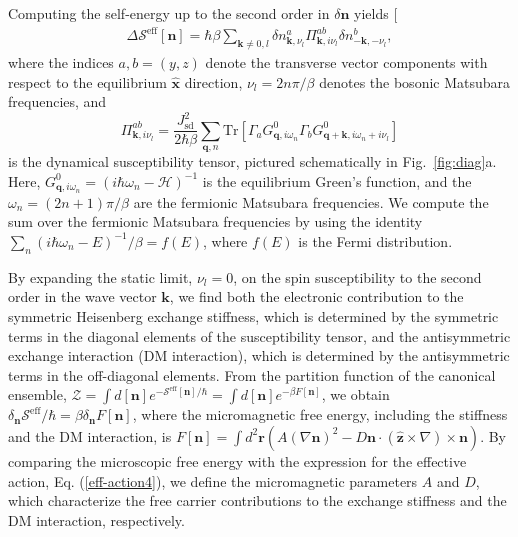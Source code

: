 \documentclass[aps,prl,twocolumn,amsmath,amssymb,superscriptaddress]{revtex4}%
\renewcommand{\cite}[1]{{[}\onlinecite{#1}{]}}
\newcommand{\be}{\begin{equation}}
\newcommand{\e}{\end{equation}}
\newcommand{\bb}{\boldsymbol}
\begin{document}
Computing the self-energy up to the second order in $\delta\bm{n}$ yields \cite{kzero}
\begin{align}
\label{eff-action4}
\Delta \mathcal{S}^{\mathrm{eff}}[\bm{n}]=\hbar\beta\sum_{\bm{k}\neq 0,l}\delta n^a_{\bm{k},\nu_l} \Pi^{ab}_{\bm{k},i\nu_l} \delta n^b_{-\bm{k},-\nu_l},
\end{align}
where the indices $a, b=(y,z)$ denote the transverse vector components with respect to the equilibrium $\hat{\bb{x}}$ direction, $\nu_l=2 n\pi/ \beta$ denotes the bosonic Matsubara frequencies, and
\be
\label{polarizibility-pi}
\Pi^{ab}_{\bm{k},i\nu_l}=\frac{J^2_{\mathrm{sd}}}{2\hbar\beta}\sum_{\bm{q},n}\mathrm{Tr}[\Gamma_a G^0_{\bm{q},i\omega_{n}}\Gamma_b G^0_{\bm{q}+\bm{k},i\omega_{n}+i\nu_l}]
\e
is the dynamical susceptibility tensor, pictured schematically in Fig.~\ref{fig:diag}a. Here, $G^0_{\bm{q},i\omega_{n}}=(i\hbar\omega_n-\mathcal{H})^{-1}$ is the equilibrium Green's function, and the $\omega_n=(2 n+1)\pi/ \beta$ are the fermionic Matsubara frequencies. We compute the sum over the fermionic Matsubara frequencies by using the identity $\sum_n (i \hbar\omega_n-E)^{-1}/\beta=f(E)$, where $f(E)$ is the Fermi distribution.

By expanding the static limit, $\nu_l=0$, on the spin susceptibility to the second order in the wave vector $\bm{k}$, we find both the electronic contribution to the symmetric Heisenberg exchange stiffness, which is determined by the symmetric terms in the diagonal elements of the susceptibility tensor, and the antisymmetric exchange interaction (DM interaction), which is determined by the antisymmetric terms in the off-diagonal elements. From the partition function of the canonical ensemble, $\mathcal{Z}=\int d[{\bm{n}}] e^{-\mathcal{S}^{\mathrm{eff}}[\bm{n}]/\hbar}=\int d[{\bm{n}}] e^{-\beta F[{\bm{n}}]}$, we obtain $\delta_{{\bm{n}}}\mathcal{S}^{\mathrm{eff}}/\hbar =\beta\delta_{\bm{n}} F[{\bm{n}}]$, where the micromagnetic free energy, including the stiffness and the DM interaction, is $F[{\bm{n}}]=\int d^2\bm{r} \left(A (\nabla {\bm{n}})^2-D {\bm{n}}\cdot(\hat{\bb{z}}\times \nabla)\times {\bm{n}}\right)$. By comparing the microscopic free energy with the expression for the effective action, Eq. (\ref{eff-action4}), we define the micromagnetic parameters $A$ and $D$, which characterize the free carrier contributions to the exchange stiffness and the DM interaction, respectively.
\end{document}
